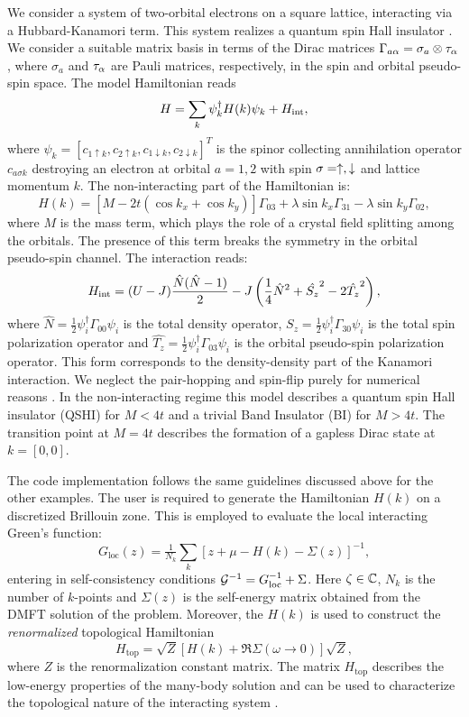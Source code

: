\documentclass[edipack_sp.tex]{subfiles}
\begin{document}
We consider a system of two-orbital electrons on a square
lattice, interacting via a Hubbard-Kanamori term. This system realizes a quantum spin Hall insulator \cite{Kane2005PRL,Bernevig2006S,Hasan2010RMP,Hohenadler2011PRL,Amaricci2015PRL,Tang2017NP,Amaricci2023PRB,Paoletti2024PRB}.
We consider a suitable matrix basis in terms of the Dirac
matrices $\Gamma_{a\alpha}=\sigma_a\otimes \tau_\alpha$, where $\sigma_a$ and
$\tau_\alpha$ are Pauli matrices, respectively, in the spin and orbital
pseudo-spin space. The  model Hamiltonian reads
$$
H = \sum_{k}\psi_{k}^\dagger H(k)\psi_{k} + H_{\rm int},
$$
where $\psi_{k}=[c_{1\uparrow k}, c_{2\uparrow k},
c_{1\downarrow k}, c_{2\downarrow k} ]^T$ is the spinor collecting
annihilation operator $c_{a\sigma k}$ destroying an electron at
orbital $a=1,2$ with spin  $\sigma=\uparrow,\downarrow$ and lattice momentum
$k$. The non-interacting part of the Hamiltonian is:
$$
H(k) = \left[M-2t(\cos{k_x}+\cos{k_y}) \right]\Gamma_{03} +
   \lambda\sin{k_x}\Gamma_{31} -   \lambda\sin{k_y}\Gamma_{02},
$$
where $M$ is the mass term, which plays the role of a crystal
field splitting among the orbitals. The presence of this term breaks
the symmetry in the orbital pseudo-spin channel.
The  interaction reads: 
$$
   H_{\rm int} = (U-J)\frac{\hat{N}(\hat{N}-1)}{2} - J\left( \frac{1}{4}\hat{N}^2 +
   \hat{S_z}^2 - 2 \hat{T_z}^2\right),
 $$
 where $\hat{N}=\tfrac{1}{2}\psi_i^\dagger \Gamma_{00}\psi_i$ is the
total density operator,
$\hat{S_z}=\tfrac{1}{2}\psi_i^\dagger \Gamma_{30}\psi_i$ is the total
spin polarization operator and $\hat{T_z}=\tfrac{1}{2}\psi_i^\dagger
\Gamma_{03}\psi_i$ is the orbital pseudo-spin polarization operator.
This form corresponds to the density-density part of the
Kanamori interaction. We neglect the pair-hopping and spin-flip purely
for numerical reasons \cite{Amaricci2022CPC}. 
%
In the non-interacting regime this model describes a
quantum spin Hall insulator (QSHI) for $M<4t$ and a trivial Band
Insulator (BI) for $M>4t$.
The transition point at $M=4t$ describes the formation of a gapless Dirac state at  $k=[0,0]$.  


The code implementation follows the same guidelines discussed above for the other examples. The user is required to generate the Hamiltonian $H(k)$ on a discretized Brillouin zone. 
This is employed to evaluate the local interacting Green's function:
$$
G_\mathrm{loc}(z) = \tfrac{1}{N_k}\sum_k \left[z+\mu-H(k)-\Sigma(z)
\right]^{-1}, 
$$
entering in self-consistency conditions ${\cal G}^{-1}=G_\mathrm{loc}^{-1}+\Sigma$. 
Here  $\zeta\in\mathbb{C}$, $N_k$ is the number of $k$-points   and $\Sigma(z)$ is the self-energy matrix  obtained from the DMFT solution of the problem.  
Moreover, the $H(k)$ is used to  construct the {\it renormalized} topological Hamiltonian \cite{Wang2010PRL,Wang2012PRX,Blason2023PRB}
$$
H_\mathrm{top} = \sqrt{Z}[H(k) + \Re\Sigma(\omega\to0)]\sqrt{Z}, 
$$
where $Z$ is the renormalization constant matrix. The matrix $H_\mathrm{top}$ describes the
low-energy properties of the many-body solution and can be used to characterize the topological nature of the interacting system \cite{Gurarie2011PRB,Wang2012PRX,Wagner2023NC,Blason2023PRB,Bau2024PRB}.  
\end{document}
